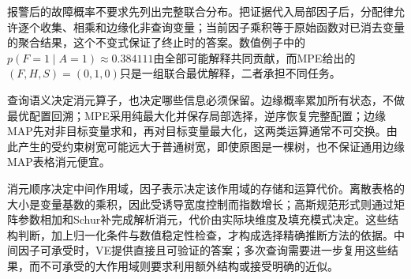报警后的故障概率不要求先列出完整联合分布。把证据代入局部因子后，分配律允许逐个收集、相乘和边缘化非查询变量；当前因子乘积等于原始函数对已消去变量的聚合结果，这个不变式保证了终止时的答案。数值例子中的$p(F=1\mid A=1)\approx0.384111$由全部可能解释共同贡献，而MPE给出的$(F,H,S)=(0,1,0)$只是一组联合最优解释，二者承担不同任务。

查询语义决定消元算子，也决定哪些信息必须保留。边缘概率累加所有状态，不做最优配置回溯；MPE采用纯最大化并保存局部选择，逆序恢复完整配置；边缘MAP先对非目标变量求和，再对目标变量最大化，这两类运算通常不可交换。由此产生的受约束树宽可能远大于普通树宽，即使原图是一棵树，也不保证通用边缘MAP表格消元便宜。

消元顺序决定中间作用域，因子表示决定该作用域的存储和运算代价。离散表格的大小是变量基数的乘积，因此受诱导宽度控制而指数增长；高斯规范形式则通过矩阵参数相加和Schur补完成解析消元，代价由实际块维度及填充模式决定。这些结构判断，加上归一化条件与数值稳定性检查，才构成选择精确推断方法的依据。中间因子可承受时，VE提供直接且可验证的答案；多次查询需要进一步复用这些结果，而不可承受的大作用域则要求利用额外结构或接受明确的近似。
